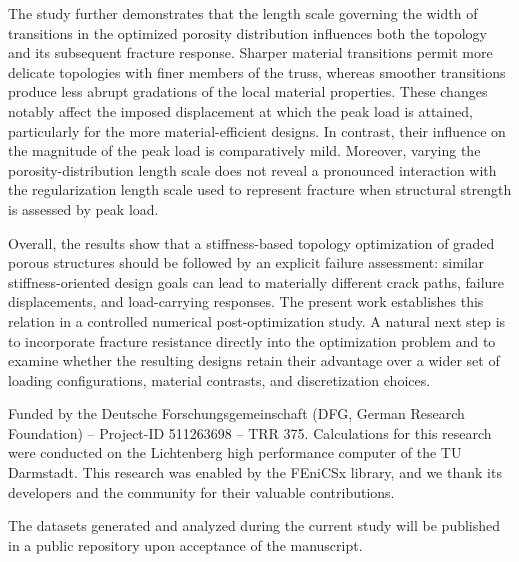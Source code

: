 \documentclass[
	pdflatex,
	sn-mathphys-num
]{sn-jnl}
\theoremstyle{thmstyleone}%
\theoremstyle{thmstyletwo}%
\theoremstyle{thmstylethree}%
\begin{document}
The study further demonstrates that the length scale governing
the width of transitions in the optimized porosity distribution
influences both the topology and its subsequent fracture
response. Sharper material transitions permit more delicate
topologies with finer members of the truss, whereas smoother
transitions produce less abrupt gradations of the local material
properties. These changes notably affect the imposed
displacement at which the peak load is attained, particularly
for the more material-efficient designs. In contrast, their
influence on the magnitude of the peak load is comparatively
mild. Moreover, varying the porosity-distribution length scale
does not reveal a pronounced interaction with the regularization
length scale used to represent fracture when structural
strength is assessed by peak load.

Overall, the results show that a stiffness-based topology
optimization of graded porous structures should be followed by
an explicit failure assessment: similar stiffness-oriented
design goals can lead to materially different crack paths,
failure displacements, and load-carrying responses. The present
work establishes this relation in a controlled numerical
post-optimization study. A natural next step is to incorporate
fracture resistance directly into the optimization problem and
to examine whether the resulting designs retain their advantage
over a wider set of loading configurations, material contrasts,
and discretization choices.

\backmatter


Funded by the Deutsche Forschungsgemeinschaft (DFG, German
Research Foundation) – Project-ID 511263698 – TRR 375.
Calculations for this research were conducted on the Lichtenberg
high performance computer of the TU Darmstadt.
This research was enabled by the FEniCSx library, and we thank
its developers and the community for their valuable
contributions.

 The datasets generated and analyzed
during the current study will be published in a public
repository upon acceptance of the manuscript.




\end{document}
